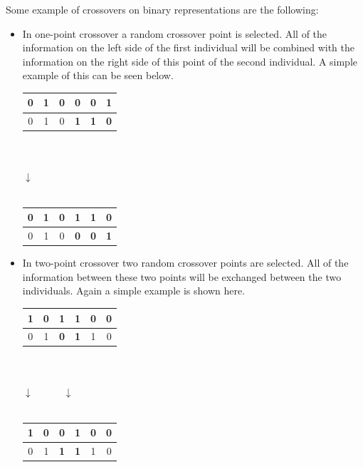 Some example of crossovers on binary representations are the following:
\begin{itemize}
\item In one-point crossover a random crossover point is selected. All of the information on the left side of the first individual will be combined with the information on the right side of this point of the second individual. A simple example of this can be seen below.
\begin{center}
\begin{tabular}{|c|c|c|c|c|c|}
\hline
0 & 1 & 0 & \textbf{0} & \textbf{0} & \textbf{1} \\ \hline \hline
0 & 1 & 0 & \textbf{1} & \textbf{1} & \textbf{0} \\ \hline
\end{tabular}
\\
$\:$ \\
$\downarrow$ \\
$\:$ \\
\begin{tabular}{|c|c|c||c|c|c|}
\hline
0 & 1 & 0 & \textbf{1} & \textbf{1} & \textbf{0} \\ \hline \hline
0 & 1 & 0 & \textbf{0} & \textbf{0} & \textbf{1} \\ \hline
\end{tabular}
\end{center}
\item In two-point crossover two random crossover points are selected. All of the information between these two points will be exchanged between the two individuals. Again a simple example is shown here.
\begin{center}
\begin{tabular}{|c|c|c|c|c|c|}
\hline
1 & 0 & \textbf{1} & \textbf{1} & 0 & 0 \\ \hline \hline
0 & 1 & \textbf{0} & \textbf{1} & 1 & 0 \\ \hline
\end{tabular}
\\
$\:$ \\
$\downarrow \qquad \quad \downarrow$ \\
$\:$ \\
\begin{tabular}{|c|c||c|c||c|c|}
\hline
1 & 0 & \textbf{0} & \textbf{1} & 0 & 0 \\ \hline \hline
0 & 1 & \textbf{1} & \textbf{1} & 1 & 0 \\ \hline
\end{tabular}
\end{center}
\end{itemize}

